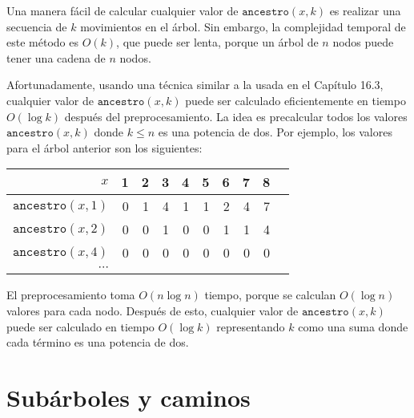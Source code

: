Una manera fácil de calcular cualquier valor de $\texttt{ancestro}(x,k)$
es realizar una secuencia de $k$ movimientos en el árbol.
Sin embargo, la complejidad temporal de este método
es $O(k)$, que puede ser lenta, porque un árbol de $n$
nodos puede tener una cadena de $n$ nodos.

Afortunadamente, usando una técnica similar a la
usada en el Capítulo 16.3, cualquier valor de $\texttt{ancestro}(x,k)$
puede ser calculado eficientemente en tiempo $O(\log k)$
después del preprocesamiento.
La idea es precalcular todos los valores $\texttt{ancestro}(x,k)$
donde $k \le n$ es una potencia de dos.
Por ejemplo, los valores para el árbol anterior
son los siguientes:

\begin{center}
\begin{tabular}{r|rrrrrrrrr}
$x$ & 1 & 2 & 3 & 4 & 5 & 6 & 7 & 8 \\
\hline
$\texttt{ancestro}(x,1)$ & 0 & 1 & 4 & 1 & 1 & 2 & 4 & 7 \\
$\texttt{ancestro}(x,2)$ & 0 & 0 & 1 & 0 & 0 & 1 & 1 & 4 \\
$\texttt{ancestro}(x,4)$ & 0 & 0 & 0 & 0 & 0 & 0 & 0 & 0 \\
$\cdots$ \\
\end{tabular}
\end{center}

El preprocesamiento toma $O(n \log n)$ tiempo,
porque se calculan $O(\log n)$ valores para cada nodo.
Después de esto, cualquier valor de $\texttt{ancestro}(x,k)$ puede ser calculado
en tiempo $O(\log k)$ representando $k$
como una suma donde cada término es una potencia de dos.

\section{Subárboles y caminos}


